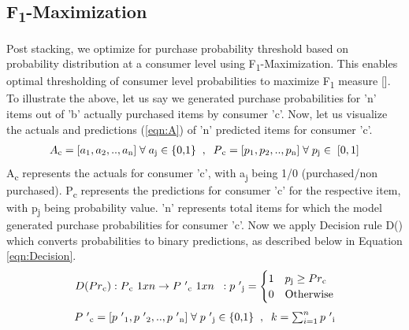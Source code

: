 \subsection{F\textsubscript{1}-Maximization}
Post stacking, we optimize for purchase probability threshold based on
probability distribution at a consumer level using F\textsubscript{1}-Maximization.
This enables optimal thresholding of consumer level probabilities to  maximize F\textsubscript{1} measure [\cite{lipton2014optimal}].
To illustrate the above, let us say we generated purchase probabilities for 
'n' items out of 'b' actually purchased items by consumer 'c'. Now, let us visualize the actuals
and predictions (\ref{eqn:A})  of 'n' predicted items for consumer 'c'.
  \begin{equation}
    \begin{array}{l}
      A\textsubscript{c} = [a\textsubscript{1}, a\textsubscript{2}, .., a\textsubscript{n}] 
       \; \forall \; a\textsubscript{j} \in \; $\{0,1\}$ \;\;,\;\;
      P\textsubscript{c} = [p\textsubscript{1}, p\textsubscript{2}, .., p\textsubscript{n}]
      \; \forall \; p\textsubscript{j} \in \; [0,1]
    \end{array}
    \label{eqn:A}
  \end{equation}
A\textsubscript{c} represents the actuals for consumer 'c', with a\textsubscript{j} being 1/0 
(purchased/non purchased). P\textsubscript{c} represents the predictions 
for consumer 'c' for the respective item, with p\textsubscript{j} being probability value. 
'n' represents total items for which the model generated purchase probabilities for consumer 'c'.
Now we apply Decision rule D() which converts probabilities to binary predictions, as described below 
in Equation \ref{eqn:Decision}.
  \begin{equation}
    \begin{array}{l}
      D(Pr\textsubscript{c}) : P\textsubscript{c}\textsuperscript{1 x n}
      \to P\textsuperscript{'}\textsubscript{c}\textsuperscript{1 x n}
      \;\; : p\textsuperscript{'}\textsubscript{j} = 
        \begin{cases}
          1 & p\textsubscript{j} \geq Pr\textsubscript{c} \\
          0 & \text{Otherwise}
        \end{cases}
    \end{array}
    \label{eqn:Decision}
  \end{equation}
  \begin{equation}
    \begin{array}{l}
      P\textsuperscript{'}\textsubscript{c} = [p\textsuperscript{'}\textsubscript{1}, 
      p\textsuperscript{'}\textsubscript{2}, .., p\textsuperscript{'}\textsubscript{n}]\; 
      \forall \; p\textsuperscript{'}\textsubscript{j} \in \; $\{0,1\}$ \;\;,\;\;
      k =\sum_{i=1}^{n}p\textsuperscript{'}\textsubscript{i}
    \end{array}
    \label{eqn:Pdash}
  \end{equation}
